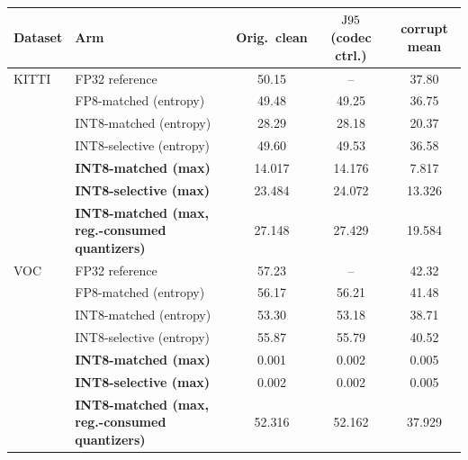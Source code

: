 \begin{tabular}{llccc}
\toprule
Dataset & Arm & Orig.\ clean & $\mathrm{J95}$ (codec ctrl.) & corrupt mean \\
\midrule
KITTI & FP32 reference & 50.15 & -- & 37.80 \\
 & FP8-matched (entropy) & 49.48 & 49.25 & 36.75 \\
 & INT8-matched (entropy) & 28.29 & 28.18 & 20.37 \\
 & INT8-selective (entropy) & 49.60 & 49.53 & 36.58 \\
\addlinespace[2pt]
 & \textbf{INT8-matched (max)} & 14.017 & 14.176 & 7.817 \\
 & \textbf{INT8-selective (max)} & 23.484 & 24.072 & 13.326 \\
 & \textbf{INT8-matched (max, reg.-consumed quantizers)} & 27.148 & 27.429 & 19.584 \\
\addlinespace[3pt]
VOC & FP32 reference & 57.23 & -- & 42.32 \\
 & FP8-matched (entropy) & 56.17 & 56.21 & 41.48 \\
 & INT8-matched (entropy) & 53.30 & 53.18 & 38.71 \\
 & INT8-selective (entropy) & 55.87 & 55.79 & 40.52 \\
\addlinespace[2pt]
 & \textbf{INT8-matched (max)} & 0.001 & 0.002 & 0.005 \\
 & \textbf{INT8-selective (max)} & 0.002 & 0.002 & 0.005 \\
 & \textbf{INT8-matched (max, reg.-consumed quantizers)} & 52.316 & 52.162 & 37.929 \\
\bottomrule
\end{tabular}
